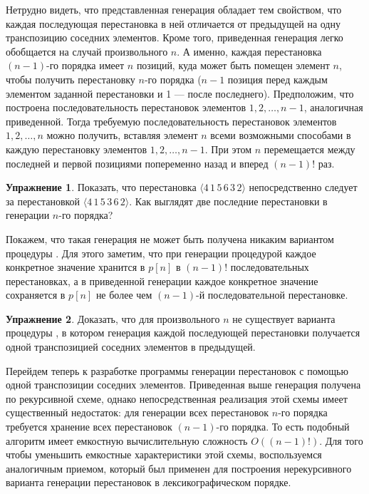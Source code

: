 \documentclass[12pt,a4paper]{article}
\theoremstyle{plain}
\theoremstyle{definition}
\newtheorem*{task}{Упражнение}
\theoremstyle{remark}
\begin{document}
Нетрудно видеть, что представленная генерация обладает тем свойством, что каждая последующая перестановка в ней отличается от предыдущей на одну транспозицию соседних элементов. Кроме того, приведенная генерация легко обобщается на случай произвольного $n$. А именно, каждая перестановка $(n-1)$-го порядка имеет $n$ позиций, куда может быть помещен элемент $n$, чтобы получить перестановку $n$-го порядка ($n-1$ позиция перед каждым элементом заданной перестановки и 1 --- после последнего). Предположим, что построена последовательность перестановок элементов $1,2,\ldots,n-1$, аналогичная приведенной. Тогда требуемую последовательность перестановок элементов $1,2,\ldots,n$ можно получить, вставляя элемент $n$ всеми возможными способами в каждую перестановку элементов $1,2,\ldots,n-1$. При этом $n$ перемещается между последней и первой позициями попеременно назад и вперед $(n-1)!$ раз.

\begin{task}
Показать, что перестановка $\langle 4\,1\,5\,6\,3\,2 \rangle$ непосредственно следует за перестановкой $\langle 4\,1\,5\,3\,6\,2 \rangle$. Как выглядят две последние перестановки в генерации $n$-го порядка?
\end{task}

Покажем, что такая генерация не может быть получена никаким вариантом процедуры \verb@perm@. Для этого заметим, что при генерации процедурой \verb@perm@ каждое конкретное значение хранится в $p[n]$ в $(n-1)!$ последовательных перестановках, а в приведенной генерации каждое конкретное значение сохраняется в $p[n]$ не более чем $(n-1)$-й последовательной перестановке.

\begin{task}
Доказать, что для произвольного $n$ не существует варианта процедуры \verb@perm@, в котором генерация каждой последующей перестановки получается одной транспозицией соседних элементов в предыдущей.
\end{task}

Перейдем теперь к разработке программы генерации перестановок с помощью одной транспозиции соседних элементов. Приведенная выше генерация получена по рекурсивной схеме, однако непосредственная реализация этой схемы имеет существенный недостаток: для генерации всех перестановок $n$-го порядка требуется хранение всех перестановок $(n-1)$-го порядка. То есть подобный алгоритм имеет емкостную вычислительную сложность $O((n-1)!)$. Для того чтобы уменьшить емкостные характеристики этой схемы, воспользуемся аналогичным приемом, который был применен для построения нерекурсивного варианта генерации перестановок в лексикографическом порядке.
\end{document}
